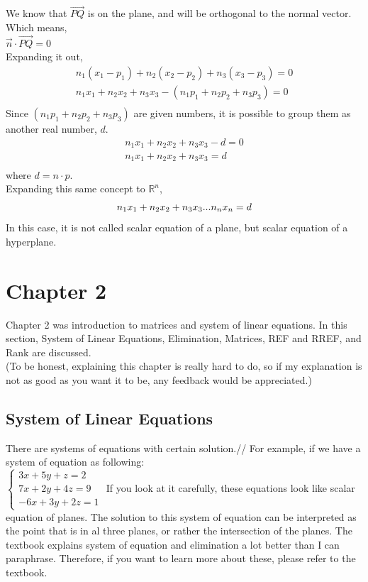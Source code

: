 \documentclass[12pt]{article}
\newcommand{\R}{\mathbb{R}}
\begin{document}
We know that $\vec{PQ}$ is on the plane, and will be orthogonal to the normal vector. Which means,\\
$\vec{n} \cdot \vec{PQ} = 0$\\
Expanding it out, 
\begin{equation}
\begin{split}
n_1(x_1-p_1)+n_2(x_2-p_2)+n_3(x_3-p_3)=0\\
n_1x_1 + n_2x_2 +n_3x_3 - (n_1p_1+n_2p_2+n_3p_3)= 0\\
\end{split}
\end{equation} 
Since $(n_1p_1+n_2p_2+n_3p_3)$ are given numbers, it is possible to group them as another real number, $d$.\\
\begin{equation}
\begin{split}
n_1x_1 + n_2x_2 +n_3x_3 - d = 0\\
n_1x_1 + n_2x_2 +n_3x_3 = d\\
\end{split}
\end{equation}
where $d = n\cdot p$.\\
Expanding this same concept to $\R^n$,
\begin{equation}
n_1x_1 + n_2x_2 +n_3x_3...n_nx_n = d\\
\end{equation}
In this case, it is not called scalar equation of a plane, but scalar equation of a hyperplane.

\section{Chapter 2}
Chapter 2 was introduction to matrices and system of linear equations. In this section, System of Linear Equations, Elimination, Matrices, REF and RREF, and Rank are discussed.\\
(To be honest, explaining this chapter is really hard to do, so if my explanation is not as good as you want it to be, any feedback would be appreciated.)

\subsection{System of Linear Equations}
There are systems of equations with certain solution.//
For example, if we have a system of equation as following:\\
$\begin{cases} 3x + 5y + z = 2\\ 7x + 2y + 4z = 9 \\ -6x + 3y + 2z = 1\end{cases}$
If you look at it carefully, these equations look like scalar equation of planes. The solution to this system of equation can be interpreted as the point that is in al three planes, or rather the intersection of the planes. 
The textbook explains system of equation and elimination a lot better than I can paraphrase. Therefore, if you want to learn more about these, please refer to the textbook.
\end{document}
